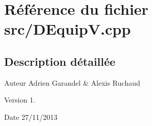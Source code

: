 \section{Référence du fichier src/\-D\-Equip\-V.cpp}
\label{_d_equip_v_8cpp}


\subsection{Description détaillée}
\begin{DoxyAuthor}{Auteur}
Adrien Garandel \& Alexis Ruchaud 
\end{DoxyAuthor}
\begin{DoxyVersion}{Version}
1. 
\end{DoxyVersion}
\begin{DoxyDate}{Date}
27/11/2013 
\end{DoxyDate}

